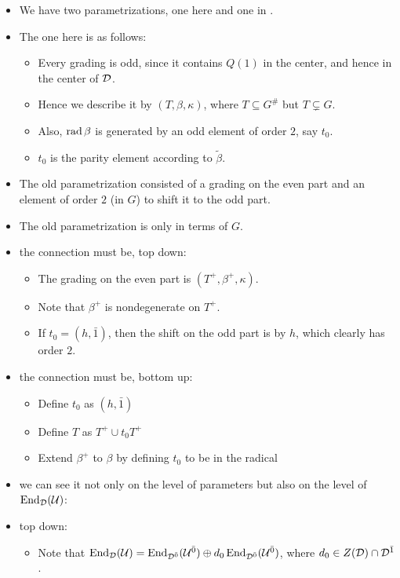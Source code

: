 \begin{itemize}
    \item We have two parametrizations, one here and one in \cite{paper-Qn}.
    \item The one here is as follows:
    \begin{itemize}
        \item Every grading is odd, since it contains $Q(1)$ in the center, and hence in the center of $\mathcal{D}$.
        \item Hence we describe it by $(T, \beta, \kappa)$, where $T\subseteq G^\#$ but $T\subsetneq G$. 
        \item Also, $\operatorname{rad} \beta$ is generated by an odd element of order $2$, say $t_0$.
        \item $t_0$ is the parity element according to $\tilde\beta$.
    \end{itemize}
    \item The old parametrization consisted of a grading on the even part and an element of order $2$ (in $G$) to shift it to the odd part.
    \item The old parametrization is only in terms of $G$.
    \item the connection must be, top down:
    \begin{itemize}
        \item The grading on the even part is $(T^+, \beta^+, \kappa)$.
        \item Note that $\beta^+$ is nondegenerate on $T^+$.
        \item If $t_0 = (h, \bar 1)$, then the shift on the odd part is by $h$, which clearly has order $2$.
    \end{itemize}
    \item the connection must be, bottom up:
    \begin{itemize}
        \item Define $t_0$ as $(h, \bar 1)$
        \item Define $T$ as $T^+ \cup t_0 T^+$
        \item Extend $\beta^+$ to $\beta$ by defining $t_0$ to be in the radical
    \end{itemize}
    \item we can see it not only on the level of parameters but also on the level of $\operatorname{End}_{\mathcal{D}} (\mathcal U)$:
    \item top down:
    \begin{itemize}
        \item Note that $\operatorname{End}_{\mathcal{D}} (\mathcal U) = \operatorname{End}_{\mathcal{D}^{\bar0}} (\mathcal U^{\bar0}) \oplus d_0 \operatorname{End}_{\mathcal{D}^{\bar0}} (\mathcal U^{\bar0})$, where $d_0 \in Z(\mathcal{D}) \cap \mathcal{D}^{\bar1}$. 

\end{itemize}
\end{itemize}
